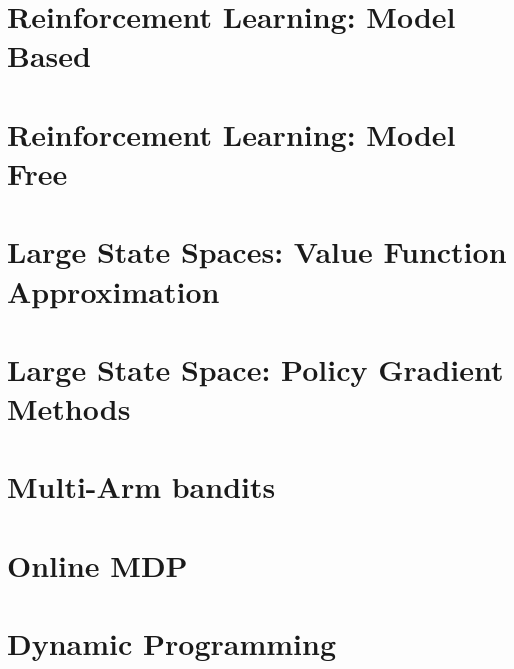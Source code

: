\documentclass[12pt]{book}
\begin{document}
\chapter{Reinforcement Learning: Model Based}\label{chapter-model-based}


\chapter{Reinforcement Learning: Model Free}
\label{chapter:learning-model-free}


\chapter{Large State Spaces: Value Function Approximation}
\label{chapter:function-approximation}


\chapter{Large State Space: Policy Gradient Methods}
\label{chapter:policy-gradient}


\chapter{ Multi-Arm bandits}
\label{chapter:MAB}


\chapter{Online MDP}
\label{chapter:OnlineMDP}


% 

% 

% 

% 

\appendix

\chapter{Dynamic Programming}
\label{chapter:dp}




\end{document}
